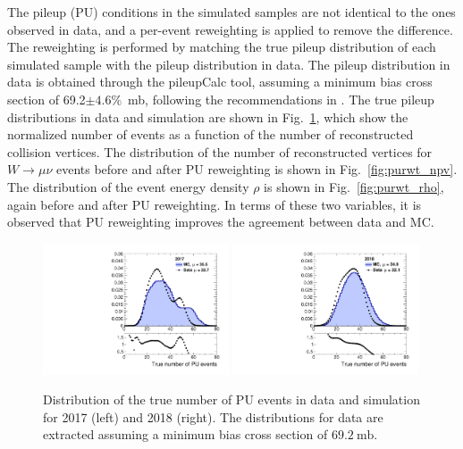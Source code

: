 The pileup (PU) conditions in the simulated samples are not identical to the ones observed in data, and a per-event reweighting is applied to remove the difference.
The reweighting is performed by matching the true pileup distribution of each simulated sample
with the pileup distribution in data. The pileup distribution in data is obtained through 
the pileupCalc tool, assuming a minimum bias cross section of 69.2$\pm 4.6\%$~mb, following the recommendations in \cite{pileup_twiki}.
The true pileup distributions in data and simulation are shown in Fig.~\ref{fig:purwg_true}, which show the normalized number of events as a function of 
the number of reconstructed collision vertices. 
The distribution of the number of reconstructed vertices 
for $W\to \mu\nu$ events before and after PU reweighting is shown in Fig.~\ref{fig:purwt_npv}. The distribution of the event energy density 
$\rho$ is shown in Fig.~\ref{fig:purwt_rho}, again before and after PU reweighting. 
In terms of these two variables, it is observed that PU reweighting improves the agreement between data and MC.

\begin{figure}[ht!]
  \begin{center}
    \includegraphics[width=0.49\textwidth]{Pileup/pu_weights_2017.pdf}
    \includegraphics[width=0.49\textwidth]{Pileup/pu_weights_2018.pdf}
    \caption{
        Distribution of the true number of PU events in data and simulation for 2017 (left) and 2018 (right).
        The distributions for data are extracted assuming a minimum bias cross section of $69.2~\mathrm{mb}$.
    }
    \label{fig:purwg_true}
  \end{center}
\end{figure}

